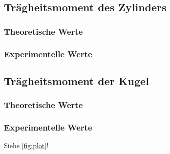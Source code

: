 \subsection{Trägheitsmoment des Zylinders}
\subsubsection{Theoretische Werte}
\subsubsection{Experimentelle Werte}
\subsection{Trägheitsmoment der Kugel}
\subsubsection{Theoretische Werte}
\subsubsection{Experimentelle Werte}


Siehe \autoref{fig:plot}!
